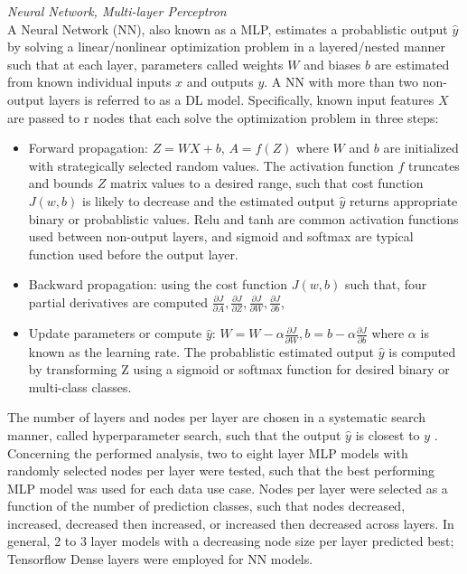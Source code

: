 \documentclass{ieeeaccess}
\begin{document}
\noindent \emph{Neural Network, Multi-layer Perceptron}\\
A Neural Network (NN), also known as a MLP, estimates a probablistic output $\hat{y}$ by solving a linear/nonlinear optimization problem in a layered/nested manner such that at each layer, parameters called weights $W$ and biases $b$ are estimated from known individual inputs $x$ and outputs $y$. A NN with more than two non-output layers is referred to as a DL model. Specifically, known input features $X$ are passed to r nodes that each solve the optimization problem in three steps:
\begin{itemize}
\item Forward propagation: $Z = WX + b$, $A = f(Z)$ where $W$ and $b$ are initialized with strategically selected random values. The activation function $f$ truncates and bounds $Z$ matrix values to a desired range, such that cost function $J(w,b)$ is likely to decrease and the estimated output $\hat{y}$ returns appropriate binary or probablistic values. Relu and tanh are common activation functions used between non-output layers, and sigmoid and softmax are typical function used before the output layer.
\item Backward propagation: using the cost function $J(w,b)$ such that, four partial derivatives are computed $\frac{\partial J}{\partial A}, \frac{\partial J}{\partial Z}, \frac{\partial J}{\partial W}, \frac{\partial J}{\partial b}$,
\item Update parameters or compute $\hat{y}$: $W = W - \alpha\frac{\partial J}{\partial W}, b = b - \alpha\frac{\partial J}{\partial b}$ where $\alpha$ is known as the learning rate. The probablistic estimated output $\hat{y}$ is computed by transforming Z using a sigmoid or softmax function for desired binary or multi-class classes.
\end{itemize}
The number of layers and nodes per layer are chosen in a systematic search manner, called hyperparameter search, such that the output $\hat{y}$ is closest to $y$ \cite{Ng_2021_Deep_learning_specialization}. Concerning the performed analysis, two to eight layer MLP models with randomly selected nodes per layer were tested, such that the best performing MLP model was used for each data use case. Nodes per layer were selected as a function of the number of prediction classes, such that nodes decreased, increased, decreased then increased, or increased then decreased across layers. In general, 2 to 3 layer models with a decreasing node size per layer predicted best; Tensorflow Dense layers were employed for NN models.\\
\end{document}
